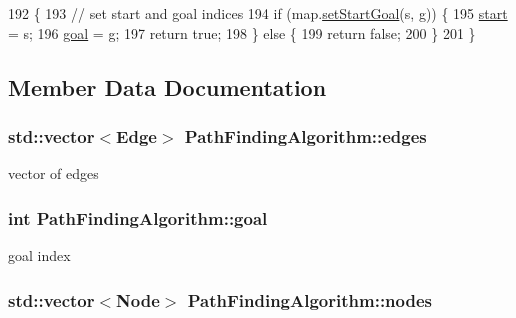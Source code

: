 \begin{DoxyCode}
192                                                 \{
193     \textcolor{comment}{// set start and goal indices}
194     \textcolor{keywordflow}{if} (map.\hyperlink{classMap_aa64162f950a1936e1eaf42609e091524}{setStartGoal}(s, g)) \{
195         \hyperlink{classPathFindingAlgorithm_a1c31bd6b8c57459c32ada19cf9bf412a}{start} = s;
196         \hyperlink{classPathFindingAlgorithm_ae8acf41f92ba72a969a44640c99fb8a4}{goal} = g;
197         \textcolor{keywordflow}{return} \textcolor{keyword}{true};
198     \} \textcolor{keywordflow}{else} \{
199         \textcolor{keywordflow}{return} \textcolor{keyword}{false};
200     \}
201 \}
\end{DoxyCode}


\subsection{Member Data Documentation}
\hypertarget{classPathFindingAlgorithm_ae535e0897714e84f5ab40d5dc5d654ec}{
\subsubsection[{edges}]{\setlength{\rightskip}{0pt plus 5cm}std\-::vector$<${\bf Edge}$>$ Path\-Finding\-Algorithm\-::edges\hspace{0.3cm}{\ttfamily [protected]}}}\label{classPathFindingAlgorithm_ae535e0897714e84f5ab40d5dc5d654ec}


vector of edges 

\hypertarget{classPathFindingAlgorithm_ae8acf41f92ba72a969a44640c99fb8a4}{
\subsubsection[{goal}]{\setlength{\rightskip}{0pt plus 5cm}int Path\-Finding\-Algorithm\-::goal\hspace{0.3cm}{\ttfamily [protected]}}}\label{classPathFindingAlgorithm_ae8acf41f92ba72a969a44640c99fb8a4}


goal index 

\hypertarget{classPathFindingAlgorithm_a3405321350d5fb10ba367c47944a7b77}{
\subsubsection[{nodes}]{\setlength{\rightskip}{0pt plus 5cm}std\-::vector$<${\bf Node}$>$ Path\-Finding\-Algorithm\-::nodes\hspace{0.3cm}{\ttfamily [protected]}}}\label{classPathFindingAlgorithm_a3405321350d5fb10ba367c47944a7b77}


